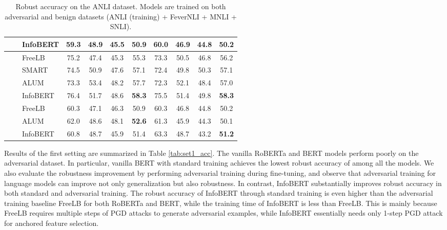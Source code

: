 \documentclass{article} \usepackage{iclr2021_conference,times}
\theoremstyle{definition}
\theoremstyle{remark}
\newcommand{\method}{InfoBERT\xspace}
\begin{document}
\begin{table}[t]
{\begin{tabular}{c|c|l|cccc|cccc}
                                                  &                                       & InfoBERT  & 59.3 & 48.9 & 45.5 & \textbf{50.9} & 60.0 & 46.9 & 44.8 & \textbf{50.2} \\
\midrule
\midrule 
{} &  & FreeLB     &  75.2 & 47.4 & 45.3 & 55.3 & 73.3 & 50.5 & 46.8 & 56.2 \\
                                                  &                                       &  SMART     &  74.5 & 50.9 & 47.6 & 57.1 & 72.4 & 49.8 & 50.3 & 57.1 \\
                                                  &                                       &  ALUM       &  73.3 & 53.4 & 48.2 & 57.7 & 72.3 & 52.1 & 48.4 & 57.0 \\
                                                  &                                       & InfoBERT    & 76.4 & 51.7 & 48.6 & \textbf{58.3} & 75.5 & 51.4 & 49.8 & \textbf{58.3}  \\
                                                  &      & FreeLB    &  60.3 & 47.1 & 46.3 & 50.9 & 60.3 & 46.8 & 44.8 & 50.2 \\
                                                  &                                       & ALUM        &  62.0 & 48.6 & 48.1 & \textbf{52.6} & 61.3 & 45.9 & 44.3 & 50.1 \\
                                                  &                                       & InfoBERT     &  60.8 & 48.7 & 45.9 & 51.4 & 63.3 & 48.7 & 43.2 & \textbf{51.2} \\
\bottomrule
\end{tabular}
}
\caption{Robust accuracy on the ANLI dataset.  Models are trained on both adversarial and benign datasets (ANLI (training) + FeverNLI + MNLI + SNLI). } 
\label{tab:set2_acc}
\vspace{-3mm}
\end{table} Results of the first setting are summarized in Table \ref{tab:set1_acc}. The vanilla RoBERTa and BERT models perform poorly on the adversarial dataset. In particular, vanilla BERT with standard training achieves the lowest robust accuracy of  among all the models. We also evaluate the robustness improvement by performing adversarial training during fine-tuning, and observe that adversarial training for language models can improve not only generalization but also robustness. In contrast, \method substantially improves robust accuracy in both standard and adversarial training. The robust accuracy of \method through standard training is even higher than the adversarial training baseline FreeLB for both RoBERTa and BERT, while the training time of \method is  less than FreeLB. This is mainly because FreeLB requires multiple steps of PGD attacks to generate adversarial examples, while \method essentially needs only 1-step PGD attack for anchored feature selection. 
\end{document}
